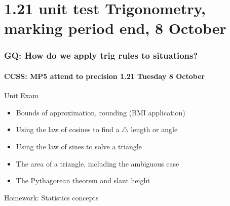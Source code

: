 \documentclass{beamer}
\begin{document}
  \section{1.21 unit test Trigonometry, marking period end, 8 October}
  \frame
  {
    \frametitle{GQ: How do we apply trig rules to situations?}
    \framesubtitle{CCSS: MP5 attend to precision \hfill \alert{1.21 Tuesday 8 October}}

    \begin{block}{Unit Exam}
      \begin{itemize}
          \item Bounds of approximation, rounding (BMI application)
          \item Using the law of cosines to find a $\triangle$ length or angle
          \item Using the law of sines to solve a triangle
          \item The area of a triangle, including the ambiguous case
          \item The Pythagorean theorem and slant height 
       \end{itemize}
      \end{block}
    Homework: Statistics concepts
  }
\end{document}
